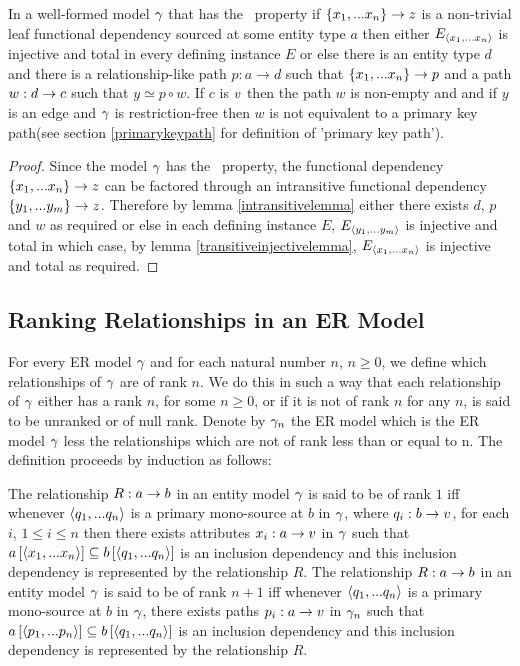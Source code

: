 \begin{lemma}
\label{mainlemma}
In a well-formed model $\gamma$ that has the \fdfactoring\ property if $\{x_1,...x_n\} \rightarrow z$ is a non-trivial leaf functional dependency sourced
at some entity type $a$ then either $E_{\langle x_1,...x_n\rangle}$ is injective and total in every defining instance $E$ 
or else there is an entity type $d$ and there is a relationship-like path $p:a \rightarrow d$ such that $\{x_1,...x_n\} \rightarrow p$
and a  path $w:d \rightarrow c$  such that $y \simeq p \circ w$. If $c$ is $v$ then
the path $w$ is non-empty and and if $y$ is an edge and $\gamma$ is restriction-free then $w$ is not equivalent to a primary key path(see section \ref{primarykeypath} for definition of 'primary key path').
\end{lemma}
\begin{proof}
Since the model $\gamma$  has the \fdfactoring\ property, the functional dependency $\left\{x_1,...x_n\right\} \rightarrow z$ can be factored through an intransitive functional
dependency $\left\{y_1,...y_m\right\} \rightarrow z$. Therefore by lemma \ref{intransitivelemma} either there exists $d$, $p$ and $w$ as required
or else in each defining instance $E$, $E_{\langle y_1,...y_m\rangle}$ is injective and total in which case, by lemma \ref{transitiveinjectivelemma}, $E_{\langle x_1,...x_n\rangle}$ is injective and total as required.
\end{proof}

\subsection{Ranking Relationships in an ER Model}
For every ER model $\gamma$ and for each natural number $n$, $n \geq 0$, we define which relationships of
$\gamma$ are of rank $n$. We do this  in such a way that each relationship of $\gamma$ either has a rank $n$, for some $n \geq 0$, or if it is not of rank 
$n$ for any $n$, is said to be unranked or of null rank. Denote by $\gamma_n$ the ER model which is the ER model 
$\gamma$ less the relationships which are not of rank less than or equal to n. The definition proceeds by induction as follows:
\begin{definition}
The relationship $R: a \rightarrow b$ in an entity model $\gamma$ is said to be of rank $1$ iff whenever 
$\langle q_1,...q_n\rangle$ is a primary mono-source at $b$ in $\gamma$, where $q_i:b \rightarrow v$, for each $i$, $1 \leq i \leq n$  then there exists attributes $x_i:a \rightarrow v$ in $\gamma$ such that $a\left[\langle x_1,...x_n\rangle\right]\subseteq b\left[\langle q_1,...q_n\rangle\right]$ is an inclusion dependency and this inclusion dependency is represented by the relationship $R$. 
The relationship $R: a \rightarrow b$ in an entity model $\gamma$ is said to be of rank $n+1$ iff whenever 
$\langle q_1,...q_n\rangle$ is a primary mono-source at $b$ in $\gamma$, there exists paths $p_i:a \rightarrow v$ in $\gamma_n$ such that $a\left[\langle p_1,...p_n\rangle\right]\subseteq b\left[\langle q_1,...q_n\rangle\right]$ is an inclusion dependency and this inclusion dependency  is represented by the relationship $R$. 
\end{definition}

